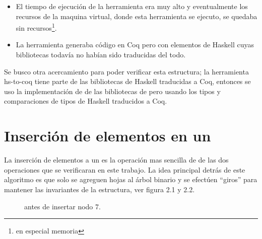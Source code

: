 \begin{itemize}
    \item El tiempo de ejecuci\'on de la herramienta era muy alto y eventualmente los recursos de
    la maquina virtual, donde esta herramienta se ejecuto, se quedaba sin recursos\footnote{en
    especial memoria}.
    \item La herramienta generaba c\'odigo en Coq pero con elementos de Haskell cuyas bibliotecas
    todavía no habían sido traducidas del todo.
\end{itemize}{}

Se busco otra acercamiento para poder verificar esta estructura; la herramienta hs-to-coq tiene
parte de las bibliotecas de Haskell traducidas a Coq, entonces se uso la implementación de {\arns}
de las bibliotecas de {\coq}\cite{MSetRBT} pero usando los tipos y comparaciones de tipos de
Haskell traducidos a Coq.

\section{Inserción de elementos en un {\arn}}

La inserci\'on de elementos a un {\arn} es la operaci\'on mas sencilla de de las dos operaciones
que se verificaran en este trabajo. La idea principal detrás de este algoritmo es que solo se
agreguen hojas al \'arbol binario y se efectúen ``giros'' para mantener las invariantes de la
estructura, ver figura 2.1 y 2.2.
\begin{figure}
\centering
\captionsetup{justification=centering}
\label{arbolRB}
\caption{{\Arn} antes de insertar nodo 7.}
\end{figure}

